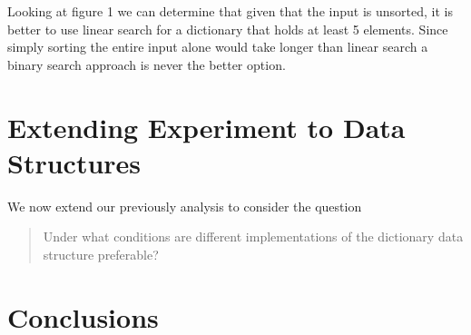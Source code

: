 \documentclass{article}
\begin{document}
Looking at figure 1 we can determine that given that the input is unsorted, it is better to use linear search for a dictionary that holds at least 5 elements. Since simply sorting the entire input alone would take longer than linear search a binary search approach is never the better option.



\section{Extending Experiment to Data Structures}
\label{sec:part3}

We now extend our previously analysis to consider the question
\begin{quote}
Under what conditions are different implementations of the dictionary data structure preferable?
\end{quote}

\section{Conclusions}
\label{sec:conclusions}
\end{document}
